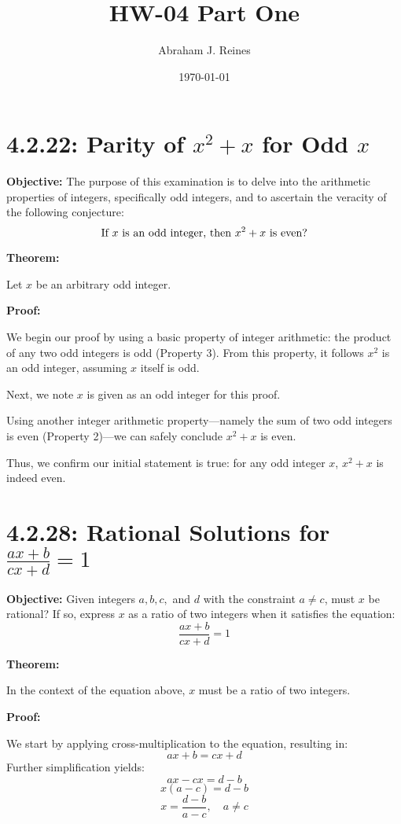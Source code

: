 \documentclass[12pt]{article}
\begin{document}
\doublespacing

\title{HW-04 Part One}
\author{Abraham J. Reines}
\date{\today}
\maketitle

\section{4.2.22: Parity of \( x^2 + x \) for Odd \( x \)}

\textbf{Objective:} The purpose of this examination is to delve into the arithmetic properties of integers, specifically odd integers, and to ascertain the veracity of the following conjecture:
\[
\text{If \( x \) is an odd integer, then \( x^2 + x \) is even?}
\]

\textbf{Theorem:}

Let \( x \) be an arbitrary odd integer.

\textbf{Proof:}

We begin our proof by using a basic property of integer arithmetic: the product of any two odd integers is odd (Property 3). From this property, it follows \( x^2 \) is an odd integer, assuming \( x \) itself is odd.

Next, we note \( x \) is given as an odd integer for this proof.

Using another integer arithmetic property—namely the sum of two odd integers is even (Property 2)—we can safely conclude \( x^2 + x \) is even.

Thus, we confirm our initial statement is true: for any odd integer \( x \), \( x^2 + x \) is indeed even.

\section{4.2.28: Rational Solutions for \( \frac{ax+b}{cx+d} = 1 \)}

\textbf{Objective:} Given integers \( a, b, c, \) and \( d \) with the constraint \( a \neq c \), must \( x \) be rational? If so, express \( x \) as a ratio of two integers when it satisfies the equation:
\[
\frac{ax+b}{cx+d} = 1
\]

\textbf{Theorem:}

In the context of the equation above, \( x \) must be a ratio of two integers.

\textbf{Proof:}

We start by applying cross-multiplication to the equation, resulting in:
\[
ax + b = cx + d
\]
Further simplification yields:
\[
ax - cx = d - b
\]
\[
x(a - c) = d - b
\]
\[
x = \frac{d - b}{a - c}, \quad a \neq c
\]
\end{document}
